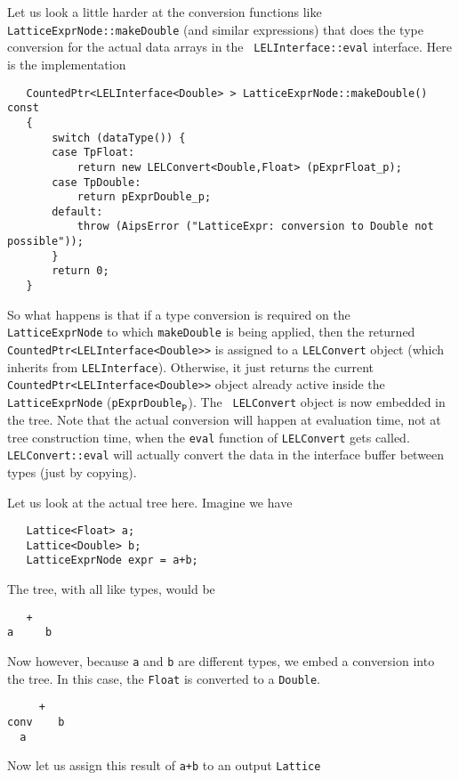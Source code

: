 Let us look a little harder at the conversion functions like {\tt
LatticeExprNode::makeDouble} (and similar expressions) that does the
type conversion for the actual data arrays in the {\tt
LELInterface::eval} interface.  Here is the implementation


\begin{verbatim}
   CountedPtr<LELInterface<Double> > LatticeExprNode::makeDouble() const
   {
       switch (dataType()) {
       case TpFloat:
           return new LELConvert<Double,Float> (pExprFloat_p);
       case TpDouble:
           return pExprDouble_p;
       default:
           throw (AipsError ("LatticeExpr: conversion to Double not possible"));
       }
       return 0;
   }
\end{verbatim}

So what happens is that if a type conversion is required on the {\tt
LatticeExprNode} to which {\tt makeDouble} is being applied, then the
returned {\tt CountedPtr<LELInterface<Double>>} is assigned to a
{\tt LELConvert} object (which inherits from {\tt LELInterface}). 
Otherwise, it just returns the current {\tt
CountedPtr<LELInterface<Double>>} object already active inside the
{\tt LatticeExprNode} ({\tt pExprDouble}$_{\tt p}$).  The {\tt
LELConvert} object is now embedded in the tree.  Note that the actual
conversion will happen at evaluation time, not at tree construction
time, when the {\tt eval} function of {\tt LELConvert} gets called. 
{\tt LELConvert::eval} will actually convert the data in the interface
buffer between types (just by copying). 

Let us look at the actual tree here.  Imagine  we have 

\begin{verbatim}
   Lattice<Float> a;
   Lattice<Double> b;
   LatticeExprNode expr = a+b;
\end{verbatim}

The tree, with all like types, would be

\begin{verbatim}
   +
a     b
\end{verbatim}

Now however, because {\tt a}  and {\tt b} are different types,
we embed a conversion into the tree.  In this case,
the {\tt Float} is converted to a {\tt Double}.

\begin{verbatim}
     +
conv    b
  a
\end{verbatim}   

Now let us assign this result of {\tt a+b} to an output {\tt Lattice}

